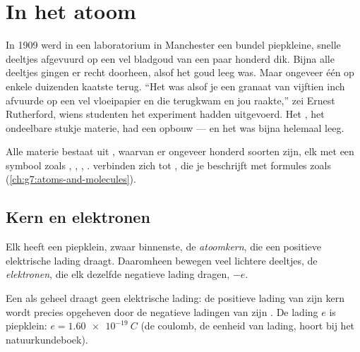 \chapter{In het atoom}\label{ch:g9:inside-the-atom}

In 1909 werd in een laboratorium in Manchester een bundel piepkleine,
snelle deeltjes afgevuurd op een vel bladgoud van een paar honderd 
dik. Bijna alle deeltjes gingen er recht doorheen, alsof het goud leeg
was. Maar ongeveer één op enkele duizenden kaatste terug. ``Het was
alsof je een granaat van vijftien inch afvuurde op een vel vloeipapier
en die terugkwam en jou raakte,'' zei Ernest Rutherford, wiens studenten
het experiment hadden uitgevoerd. Het , het ondeelbare stukje
materie, had een opbouw --- en het was bijna helemaal leeg.

\begin{recall}
Alle materie bestaat uit , waarvan er ongeveer honderd soorten
zijn, elk met een symbool zoals , , , . 
verbinden zich tot , die je beschrijft met formules zoals
 (\cref{ch:g7:atoms-and-molecules}).
\end{recall}

\section{Kern en elektronen}

\begin{definition}\label{def:g9:inside-the-atom:nucleus}
Elk  heeft een piepklein, zwaar binnenste, de
\emph{atoomkern}, die een positieve elektrische lading
draagt. Daaromheen bewegen veel lichtere deeltjes, de
\emph{elektronen}, die elk dezelfde negatieve lading
dragen, $-e$.
\end{definition}

\begin{proposition}\label{prop:g9:inside-the-atom:neutral}
Een  als geheel draagt geen elektrische lading: de positieve lading
van zijn kern wordt precies opgeheven door de negatieve ladingen van zijn
. De lading $e$ is piepklein: $e = \qty{1.60e-19}{C}$ (de
coulomb, de eenheid van lading, hoort bij het natuurkundeboek).
\end{proposition}

